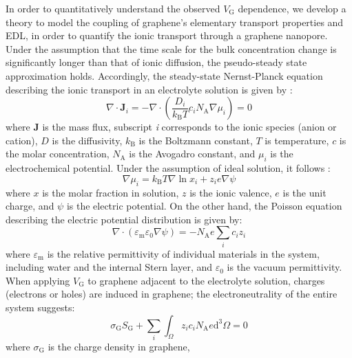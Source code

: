 \documentclass[journal=langd5,email=true, hyperref=true, keywords=false]{achemso}
\begin{document}
In order to quantitatively understand the observed $V_{\mathrm{G}}$
dependence, we develop a theory to model the coupling of graphene’s
elementary transport properties and EDL, in order to quantify the
ionic transport through a graphene nanopore. Under the assumption that
the time scale for the bulk concentration change is significantly
longer than that of ionic diffusion, the pseudo-steady state
approximation holds. Accordingly, the steady-state Nernst-Planck
equation describing the ionic transport in an electrolyte solution is
given by \cite{MacGillivray_1968}:
\begin{equation}
  \label{eq:pnp}
  \nabla \cdot \boldsymbol{J}_{i} = -\nabla \cdot (\frac{D_{i}}{k_{\mathrm{B}}T} c_{i} N_{\mathrm{A}} \nabla \mu_{i}) = 0
\end{equation}
where $\boldsymbol{J}$ is the mass flux, subscript \textit{i}
corresponds to the ionic species (anion or cation), $D$ is the diffusivity,
$k_{\mathrm{B}}$ is the Boltzmann constant, $T$ is temperature, $c$ is
the molar concentration, $N_{\mathrm{A}}$ is the Avogadro constant,
and $\mu_{i}$ is the electrochemical potential. Under the assumption
of ideal solution, it follows \cite{Kilic_2007}:
\begin{equation}
  \label{eq:mu}
  \nabla \mu_{i} = k_{\mathrm{B}} T \nabla \ln x_{i} + z_{i} e \nabla \psi
\end{equation}
where $x$ is the molar fraction in solution, $z$ is the ionic valence,
$e$ is the unit charge, and $\psi$ is the electric potential. On the
other hand, the Poisson equation describing the electric potential
distribution is given by:
\begin{equation}
  \label{eq:poisson}
  \nabla \cdot (\varepsilon_{\mathrm{m}} \varepsilon_{0} \nabla \psi)
  =
  - N_{\mathrm{A}} e \sum_{i} c_{i} z_{i}
\end{equation}
where $\varepsilon_{\mathrm{m}}$ is the relative permittivity of
individual materials in the system, including water and the internal
Stern layer\cite{Tian_2017}, and
$\varepsilon_{0}$ is the vacuum permittivity. When applying
$V_{\mathrm{G}}$ to graphene adjacent to the electrolyte solution,
charges (electrons or holes) are induced in graphene; the
electroneutrality of the entire system suggests:
\begin{equation}
  \label{eq:electro-neutral}
  \sigma_{\mathrm{G}} S_{\mathrm{G}} + \sum_{i} \int_{\Omega} z_{i} c_{i} N_{\mathrm{A}} e \mathrm{d}^{3} \Omega= 0
\end{equation}
where $\sigma_{\mathrm{G}}$ is the charge density in graphene,
\end{document}
